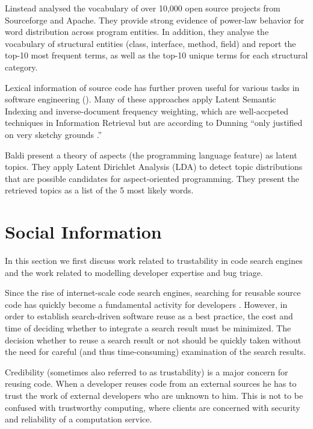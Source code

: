 Linstead \etal \cite{Linstead09SUITE} analysed the vocabulary of over 10,000 open source projects from Sourceforge and Apache. They provide strong evidence of power-law behavior for word distribution across program entities. In addition, they analyse the vocabulary of structural entities (class, interface, method, field) and report the top-10 most frequent terms, as well as the top-10 unique terms for each structural category.

Lexical information of source code has further proven useful for various tasks in software engineering (\eg \cite{Anto02a,Marc05a,Posh09a}). Many of these approaches apply Latent Semantic Indexing and inverse-document frequency weighting, which are well-accpeted techniques in Information Retrieval but are according to Dunning ``only justified on very sketchy grounds \cite{Dunning}.''

Baldi \etal \cite{Bald08a} present a theory of aspects (the programming language feature) as latent topics. They apply Latent Dirichlet Analysis (LDA) to detect topic distributions that are possible candidates for aspect-oriented programming. They present the retrieved topics as a list of the 5 most likely words. 


\section{Social Information}

In this section we first discuss work related to trustability in code search engines and the work related to modelling developer expertise and bug triage.

Since the rise of internet-scale code search engines, searching for reusable source code has quickly become a fundamental activity for developers \cite{Kuhn09b}. However, in order to establish search-driven software reuse as a best practice, the cost and time of deciding whether to integrate a search result must be minimized. The decision whether to reuse a search result or not should be quickly taken without the need for careful (and thus time-consuming) examination of the search results.

Credibility (sometimes also referred to as trustability) is a major concern for reusing code. When a developer reuses code from an external sources he has to trust the work of external developers who are unknown to him. This is not to be confused with trustworthy computing, where clients are concerned with security and reliability of a computation service.

